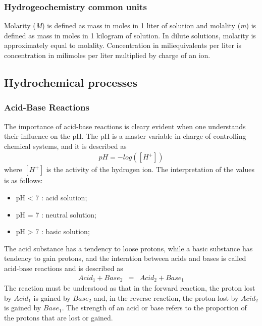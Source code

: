 \documentclass[ppgc,mestrado,English]{iiufrgs}
\begin{document}
\subsubsection{Hydrogeochemistry common units}
Molarity (\emph{M}) is defined as mass in moles in 1 liter of solution and molality (\emph{m}) is defined as mass in moles in 1 kilogram of solution. In dilute solutions, molarity is approximately equal to molality. Concentration in miliequivalents per liter is concentration in milimoles per liter multiplied by charge of an ion.

\subsection{Hydrochemical processes}

\subsubsection{Acid-Base Reactions}
The importance of acid-base reactions is cleary evident when one understands their influence on the pH. The pH is a master variable in charge of controlling chemical systems, and it is described as
\begin{eqnarray}
pH = - log([H^+])
\end{eqnarray}
where $[H^+]$ is the activity of the hydrogen ion. The interpretation of the values is as follows:
\begin{itemize}
\item pH < 7 : acid solution;
\item pH = 7 : neutral solution;
\item pH > 7 : basic solution;
\end{itemize}
The acid substance has a tendency to loose protons, while a basic substance has tendency to gain protons, and the interation between acids and bases is called acid-base reactions and is described as
\begin{eqnarray}
Acid_1 + Base_2 &=& Acid_2 + Base_1
\end{eqnarray}
The reaction must be understood as that in the forward reaction, the proton lost by $Acid_1$ is gained by $Base_2$ and, in the reverse reaction, the proton lost by $Acid_2$ is gained by $Base_1$.  The strength of an acid or base refers to the proportion of the protons that are lost or gained. 

\end{document}
